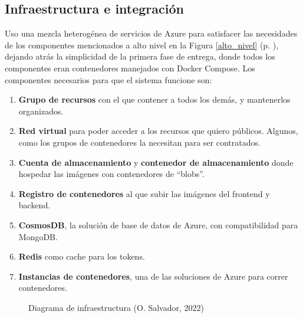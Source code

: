 \documentclass[11pt]{article}
\begin{document}
\begin{flushleft}
\clearpage
\section{Infraestructura e integración}
Uso una mezcla heterogénea de servicios de Azure para satisfacer las necesidades de los componentes mencionados a alto nivel en la Figura \ref{alto_nivel} (p. \pageref{alto_nivel}), dejando atrás la simplicidad de la primera fase de entrega, donde todos los componentes eran contenedores manejados con Docker Compose. Los componentes necesarios para que el sistema funcione son:
	\begin{enumerate}
		\itemsep0em 
		\item \textbf{Grupo de recursos} con el que contener a todos los demás, y mantenerlos organizados.
		\item \textbf{Red virtual} para poder acceder a los recursos que quiero públicos. Algunos, como los grupos de contenedores la necesitan para ser contratados.
		\item \textbf{Cuenta de almacenamiento} y \textbf{contenedor de almacenamiento} donde hospedar las imágenes con contenedores de ``blobs''.
		\item \textbf{Registro de contenedores} al que subir las imágenes del frontend y backend.
		\item \textbf{CosmosDB}, la solución de base de datos de Azure, con compatibilidad para MongoDB.
		\item \textbf{Redis} como cache para los tokens.
		\item \textbf{Instancias de contenedores}, una de las soluciones de Azure para correr contenedores.
	\end{enumerate}

	\begin{figure}[htb]
		\centering
		\caption{Diagrama de infraestructura (O. Salvador, 2022)}
	\end{figure}






\end{flushleft}
\end{document}

